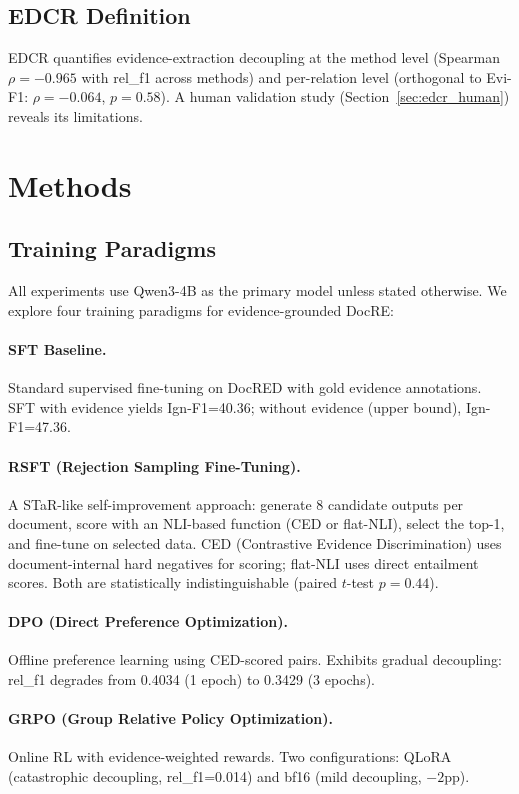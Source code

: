 \documentclass[11pt]{article}
\begin{document}
\subsection{EDCR Definition}

EDCR quantifies evidence-extraction decoupling at the method level (Spearman $\rho = -0.965$ with rel\_f1 across methods) and per-relation level (orthogonal to Evi-F1: $\rho = -0.064$, $p=0.58$). A human validation study (Section~\ref{sec:edcr_human}) reveals its limitations.

\section{Methods}

\subsection{Training Paradigms}

All experiments use Qwen3-4B as the primary model unless stated otherwise. We explore four training paradigms for evidence-grounded DocRE:

\paragraph{SFT Baseline.} Standard supervised fine-tuning on DocRED with gold evidence annotations. SFT with evidence yields Ign-F1=40.36; without evidence (upper bound), Ign-F1=47.36.

\paragraph{RSFT (Rejection Sampling Fine-Tuning).} A STaR-like self-improvement approach: generate 8 candidate outputs per document, score with an NLI-based function (CED or flat-NLI), select the top-1, and fine-tune on selected data. CED (Contrastive Evidence Discrimination) uses document-internal hard negatives for scoring; flat-NLI uses direct entailment scores. Both are statistically indistinguishable (paired $t$-test $p=0.44$).

\paragraph{DPO (Direct Preference Optimization).} Offline preference learning using CED-scored pairs. Exhibits gradual decoupling: rel\_f1 degrades from 0.4034 (1 epoch) to 0.3429 (3 epochs).

\paragraph{GRPO (Group Relative Policy Optimization).} Online RL with evidence-weighted rewards. Two configurations: QLoRA (catastrophic decoupling, rel\_f1=0.014) and bf16 (mild decoupling, $-2$pp).
\end{document}
